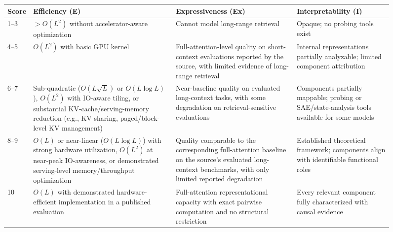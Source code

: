 \documentclass[10pt,twocolumn]{article}
\newif\ifshrinkfloats
\newcommand{\sflt}[2]{\ifshrinkfloats#1\else#2\fi}
\begin{document}
\begin{figure}[!p]
\centering
\begin{minipage}{0.98\textwidth}
\centering
\sflt{\renewcommand{\baselinestretch}{0.84}\fontsize{12}{14.4}\selectfont}{\footnotesize}
\renewcommand{\arraystretch}{\sflt{0.7}{1.0}}


\begin{tabular}{p{0.8cm}p{3.2cm}p{3.2cm}p{3.2cm}}
\toprule
Score & Efficiency (E) & Expressiveness (Ex) & Interpretability (I) \\
\midrule
1--3 & $>O(L^2)$ without accelerator-aware optimization & Cannot model long-range retrieval & Opaque; no probing tools exist \\
4--5 & $O(L^2)$ with basic GPU kernel & Full-attention-level quality on short-context evaluations reported by the source, with limited evidence of long-range retrieval & Internal representations partially analyzable; limited component attribution \\
6--7 & Sub-quadratic ($O(L\sqrt{L})$ or $O(L\log L)$), $O(L^2)$ with IO-aware tiling, or substantial KV-cache/serving-memory reduction (e.g., KV sharing, paged/block-level KV management) & Near-baseline quality on evaluated long-context tasks, with some degradation on retrieval-sensitive evaluations & Components partially mappable; probing or SAE/state-analysis tools available for some models \\
8--9 & $O(L)$ or near-linear ($O(L\log L)$) with strong hardware utilization, $O(L^2)$ at near-peak IO-awareness, or demonstrated serving-level memory/throughput optimization & Quality comparable to the corresponding full-attention baseline on the source's evaluated long-context benchmarks, with only limited reported degradation & Established theoretical framework; components align with identifiable functional roles \\
10 & $O(L)$ with demonstrated hardware-efficient implementation in a published evaluation & Full-attention representational capacity with exact pairwise computation and no structural restriction & Every relevant component fully characterized with causal evidence \\
\bottomrule
\end{tabular}

\label{tab:eei-rubric}
\end{minipage}
\vspace{8pt}
\centering


\end{figure}
\end{document}

